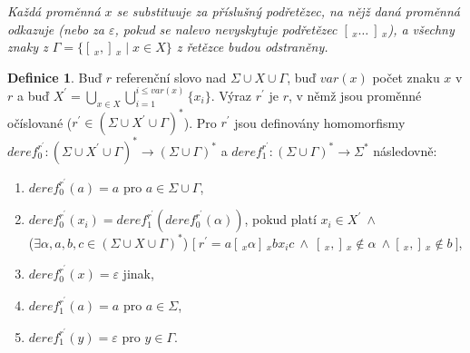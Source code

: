 \documentclass[thesis=B,czech]{FITthesis}[2019/12/23]
\theoremstyle{definition}
\newtheorem{definition}{Definice}[chapter]
\begin{document}
\emph{Každá proměnná $x$ se substituuje za příslušný podřetězec, na nějž daná proměnná odkazuje (nebo za $\varepsilon$, pokud se nalevo nevyskytuje podřetězec $[\,_x \dots \ ]\,_x$), a všechny znaky z $\Gamma = \{ [\,_x , ]\,_x \mid x \in X \}$ z řetězce budou odstraněny.}
\begin{definition}
Buď $r$ referenční slovo nad ${\Sigma \cup X \cup \Gamma}$, buď $var \left( x \right)$ počet znaku $x$ v $r$ a buď $X^\prime = \bigcup\limits_{x \in X} \bigcup\limits_{i=1}^{i \leq var \left( x \right)} \{x_i\}$. Výraz $r^\prime$ je $r$, v němž jsou proměnné očíslované ($r^\prime \in \left(\Sigma \cup X^\prime  \cup \Gamma \right)^\ast$). Pro $r^\prime$ jsou definovány homomorfismy $deref_0^{r^\prime} :  \left(\Sigma \cup X^\prime \cup \Gamma\right)^\ast \rightarrow  \left(\Sigma \cup \Gamma\right)^\ast$ a $deref_1^{r^\prime} : \left(\Sigma \cup \Gamma\right)^\ast \rightarrow \Sigma^\ast$ následovně:
\begin{enumerate}
	\item{$deref_0^{r^\prime} \left( a \right) = a$ pro $a \in \Sigma \cup \Gamma$, }
	\item{$deref_0^{r^\prime} \left( x_i \right) = deref_1^{r^\prime} \left( deref_0^{r^\prime} \left( \alpha \right) \right) $, pokud platí $x_i \in X^\prime \ \wedge $ \\ \bigg($\exists  \alpha, a, b, c \in \left(\Sigma \cup X \cup \Gamma\right)^\ast$\bigg) $\bigg[ \ r^\prime = a [\,_x \alpha  ]\,_x b x_i c \ \wedge \ [\,_x ,  ]\,_x \notin \alpha \ \wedge [\,_x ,  ]\,_x \notin b \ \bigg]$,}
        \item\label{rule:eps}{$deref_0^{r^\prime} \left( x \right) = \varepsilon$ jinak,}
	\item{$deref_1^{r^\prime} \left( a \right) = a$ pro $a \in \Sigma$,}
	\item\label{rule:6}{$deref_1^{r^\prime} \left( y \right) = \varepsilon$ pro $y \in \Gamma$.}
\end{enumerate}
\end{definition}
\end{document}
